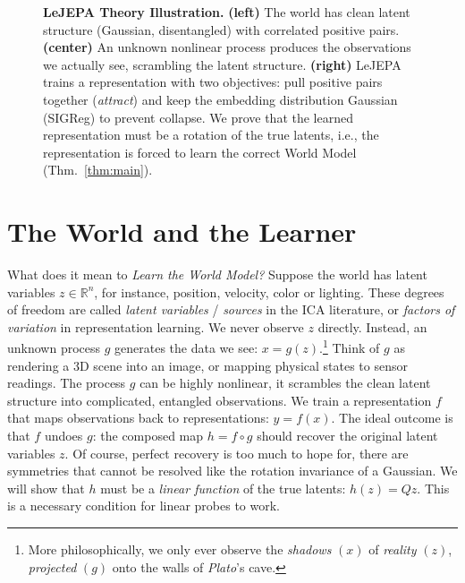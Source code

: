 \documentclass{article}
\begin{document}
\begin{figure}[t]
    \centering
    
    \vspace{10pt}
    \caption{
        \textbf{LeJEPA Theory Illustration.} 
        \textbf{(left)} The world has clean latent structure (Gaussian, disentangled) with correlated positive pairs. 
        \textbf{(center)} An unknown nonlinear process produces the observations we actually see, scrambling the latent structure. 
        \textbf{(right)} LeJEPA trains a representation with two objectives: pull positive pairs together (\textit{attract}) and keep the embedding distribution Gaussian (SIGReg) to prevent collapse. We prove that the learned representation must be a rotation of the true latents, i.e., the representation is forced to learn the correct World Model (Thm.~\ref{thm:main}).
    }
    \label{fig:overview}
\end{figure}


\section{The World and the Learner}\label{sec:setup}

What does it mean to \textit{Learn the World Model?}
Suppose the world has latent variables $z \in \mathbb{R}^n$, for instance, position, velocity, color or lighting.
These degrees of freedom are called \emph{latent variables} / \textit{sources} in the ICA literature, or \emph{factors of variation} \citep{bengio2013representation} in representation learning.
We never observe $z$ directly.
Instead, an unknown process $g$ generates the data we see: $x = g(z)$.\footnote{More philosophically, we only ever observe the \textit{shadows} \((x)\) of \textit{reality} \((z)\), \textit{projected} \((g)\) onto the walls of \textit{Plato}'s cave.}
Think of $g$ as rendering a 3D scene into an image, or mapping physical states to sensor readings.
The process $g$ can be highly nonlinear, it scrambles the clean latent structure into complicated, entangled observations.
We train a representation $f$ that maps observations back to representations: $y = f(x)$.
The ideal outcome is that $f$ undoes $g$: the composed map $h = f \circ g$ should recover the original latent variables $z$.
Of course, perfect recovery is too much to hope for, there are symmetries that cannot be resolved like the rotation invariance of a Gaussian.
We will show that $h$ must be a \emph{linear function} of the true latents: $h(z) = Qz$.
This is a necessary condition for linear probes to work.
\end{document}
